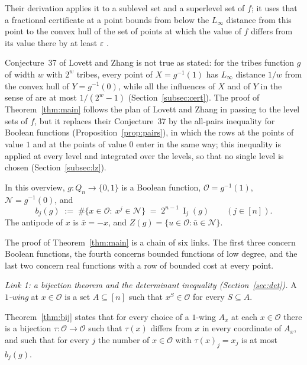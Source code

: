 \documentclass[11pt,reqno]{amsart}
\makeatletter
\theoremstyle{definition}
\theoremstyle{remark}
\numberwithin{equation}{section}
\theoremstyle{named}
\theoremstyle{plain}
\renewcommand{\subsection}{\@startsection{subsection}{2}%
  \z@{1.0\linespacing\@plus.4\linespacing\@minus.15\linespacing}{-.5em}{\normalfont\bfseries}}
\newcommand{\I}{\operatorname{I}}
\newcommand{\cO}{\mathcal{O}}
\newcommand{\cN}{\mathcal{N}}
\newcommand{\eps}{\varepsilon}
\makeatother
\begin{document}
Their derivation applies it to a sublevel
set and a superlevel set of $f$; it uses that a fractional certificate at a point bounds from below the
$L_\infty$ distance from this point to the convex hull of the set of points at which the value of $f$
differs from its value there by at least $\eps$ \cite[Lemma~28]{LZ}.

Conjecture~37 of Lovett and Zhang is not true as stated: for the tribes function $g$ of width $w$ with
$2^{w}$ tribes, every point of $X=g^{-1}(1)$ has $L_\infty$ distance $1/w$ from the convex hull of
$Y=g^{-1}(0)$, while all the influences of $X$ and of $Y$ in the sense of \cite[Definition~36]{LZ}
are at most $1/(2^{w}-1)$ (Section~\ref{subsec:cert}). The proof of Theorem~\ref{thm:main} follows
the plan of Lovett and Zhang in passing to the level sets of $f$, but it replaces their
Conjecture~37 by the all-pairs inequality for Boolean functions (Proposition~\ref{prop:pairs}), in which
the rows at the points of value $1$ and at the points of value $0$ enter in the same way; this
inequality is applied at every level and integrated over the levels, so that no single level is
chosen (Section~\ref{subsec:lz}).

\subsection{Overview of the proof}\label{subsec:overview}

In this overview, $g\colon Q_n\to\{0,1\}$ is a Boolean function, $\cO=g^{-1}(1)$, $\cN=g^{-1}(0)$, and
\[
   b_j(g)\;:=\;\#\{x\in\cO:\ x^{j}\in\cN\}\;=\;2^{n-1}\,\I_j(g)\qquad(j\in[n]).
\]
The antipode of $x$ is $\bar x=-x$, and $Z(g)=\{u\in\cO:\bar u\in\cN\}$.

The proof of
Theorem~\ref{thm:main} is a chain of six links. The first three concern Boolean functions, the
fourth concerns bounded functions of low degree, and the last two concern real functions with a
row of bounded cost at every point.

\medskip\noindent\emph{Link 1: a bijection theorem and the determinant inequality
\textup{(Section~\ref{sec:det})}.}
A \emph{$1$-wing} at $x\in\cO$ is a set $A\subseteq[n]$ such that $x^{S}\in\cO$ for every
$S\subseteq A$.

Theorem~\ref{thm:bij} states that for every choice of a $1$-wing $A_x$ at each
$x\in\cO$ there is a bijection $\tau\colon\cO\to\cO$ such that $\tau(x)$ differs from $x$ in every
coordinate of $A_x$, and such that for every $j$ the number of $x\in\cO$ with $\tau(x)_j=x_j$ is at
most $b_j(g)$.
\end{document}
